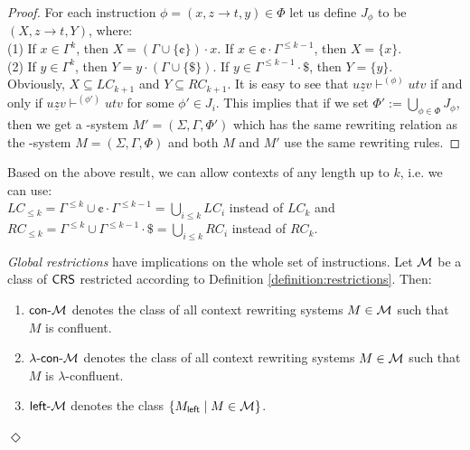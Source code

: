 \begin{proof}
For each instruction $\phi = (x, z \to t, y) \in \Phi$ let us define $J_{\phi}$ to be $(X, z \to t, Y)$, where:\\
(1) \quad If $x \in \Gamma^k$, then $X = (\Gamma \cup \{ \cent \}) \cdot x$. If $x \in \cent \cdot \Gamma^{\le k-1}$, then $X = \{ x \}$.\\
(2) \quad If $y \in \Gamma^k$, then $Y = y \cdot (\Gamma \cup \{ \$ \})$. If $y \in \Gamma^{\le k-1}\cdot\$ $, then $Y = \{ y \}$.\\
Obviously, $X \subseteq LC_{k+1}$ and $Y \subseteq RC_{k+1}$.
It is easy to see that $u \underline{z} v \vdash^{(\phi)} utv$ if and only if $u \underline{z} v \vdash^{(\phi')} utv$ for some $\phi' \in J_i$. This implies that if we set $\Phi' := \bigcup_{\phi \in \Phi}{J_{\phi}}$, then we get a \kCRS[(k+1)]-system $M'=(\Sigma, \Gamma, \Phi')$ which has the same rewriting relation as the \kCRS[k]-system $M=(\Sigma, \Gamma, \Phi)$ and both $M$ and $M'$ use the same rewriting rules.
\end{proof}

\begin{remark}
Based on the above result, we can allow contexts of any length up to $k$, i.e. we can use:\\
\indent $LC_{\le k} = \Gamma^{\le k} \cup \cent \cdot \Gamma^{\le k-1} = \bigcup_{i \le k} LC_i$ instead of $LC_k$ and\\
\indent $RC_{\le k} = \Gamma^{\le k} \cup \Gamma^{\le k-1} \cdot \$ = \bigcup_{i \le k} RC_i$ instead of $RC_k$.
\end{remark}

\begin{definition}\label{definition:restrictions-global}
\emph{Global restrictions} have implications on the whole set of instructions. Let $\textup{\sf $\mathcal{M}$}$ be a class of $\mbox{\sf CRS\/}$ restricted according to Definition \ref{definition:restrictions}. Then:
\begin{enumerate}
\item\label{restriction:conf}
$\textup{\sf con-\textup{\sf $\mathcal{M}$}}$ denotes the class of all context rewriting systems $M \in \textup{\sf $\mathcal{M}$}$ such that $M$ is confluent.

\item\label{restriction:lambda}
$\textup{\sf $\lambda$-con-\textup{\sf $\mathcal{M}$}}$ denotes the class of all context rewriting systems $M \in \textup{\sf $\mathcal{M}$}$ such that $M$ is $\lambda$-confluent.

\item\label{restriction:left}
$\textup{\sf left-\textup{\sf $\mathcal{M}$}}$ denotes the class $\{M_{\sf left} \mid M \in \textup{\sf $\mathcal{M}$}\}$.
\end{enumerate}
\hfill$\Diamond$
\end{definition}

